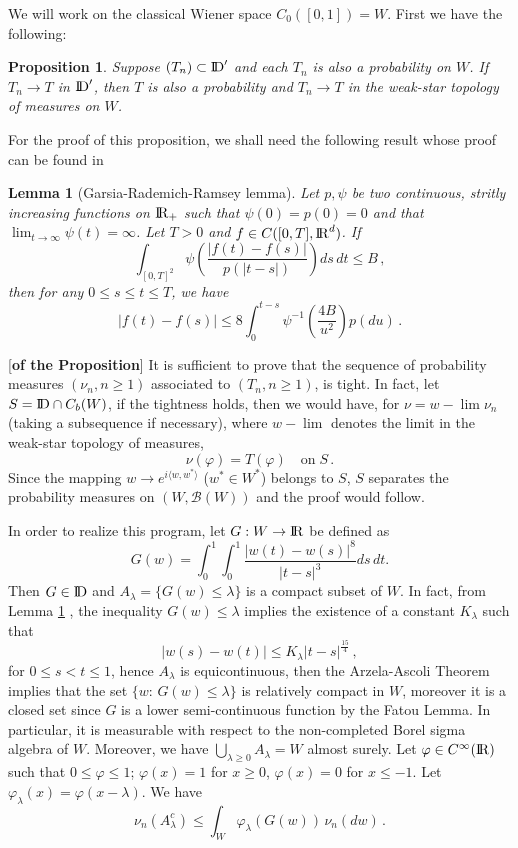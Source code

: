 \documentclass[12pt,a4paper]{book}
\newtheorem{lemma}[theorem]{Lemma}
\newtheorem{proposition}[theorem]{Proposition}
\newcommand{\la}{\lambda}
\newcommand{\B}{{\mathcal B}}
\newcommand{\DD}{{\rm I\!D}}
\newcommand{\R}{{\rm I\!R}}
\newcommand{\proof}{\noindent {\bf Proof:\ }}
\begin{document}
We will work on the classical Wiener space $C_0([0,1])=W$. First we have the
following:

\begin{proposition}
\label{basic-prop}
Suppose $(T_n)\subset \DD'$ and each $T_n$ is also a probability on $W$. If
$T_n\to T$ in $ \DD'$, then $T$ is also a probability and $T_n\to T$
in the weak-star  topology of measures on $W$.
\end{proposition}

\noindent
For the proof of this proposition, we shall need the following result
whose proof can be found in \cite{S-V}
\begin{lemma}[Garsia-Rademich-Ramsey lemma]
\label{lemma-GRR}
Let $p,\psi$ be two continuous, stritly increasing functions on $\R_+$
such that $\psi(0)=p(0)=0$ and that
$\lim_{t\to\infty}\psi(t)=\infty$. Let $T>0$ and $f\in
C([0,T],\R^d)$. If
$$
\int_{[0,T]^2}\psi\left(\frac{|f(t)-f(s)|}{p(|t-s|)}\right)ds \,dt\leq
B\,,
$$
then for any $0\leq s\leq t\leq T$, we have 
$$
|f(t)-f(s)|\leq
8\int_0^{t-s}\psi^{-1}\left(\frac{4B}{u^2}\right)p(du)\,.
$$
\end{lemma}
\proof[{\bf{of the Proposition}}]
It is sufficient to prove that the sequence  of  probability measures
$(\nu_n, n\geq 1)$
associated to $(T_n,n\geq 1)$, is tight. In fact, let $S= \DD \cap C_b(W)$,
if the tightness holds, then we would  have, for $\nu=w-\lim \nu_n$
(taking a subsequence if necessary),
where $w-\lim$ denotes the limit in the weak-star topology of measures, 
$$
\nu(\varphi)=T(\varphi)\quad {\mbox{on}}\; S\,.
$$
Since the mapping  $w\to e^{i\langle w,w^\ast\rangle}$ ($w^\ast\in
W^\ast$) belongs to $S$, $S$ separates the probability measures on
$(W,\B(W))$  and the proof would follow.

In order to realize this program, let $G:W\to \R$ be defined as
$$
G(w)=\int_0^1\!\!\int_0^1
\frac{|w(t)-w(s)|^8}{|t-s|^3}ds\,dt.
$$
Then  $G\in \DD$ and
$A_{\lambda}=\{G(w)\leq\lambda\}$ is a compact
subset of $W$. In fact, from  Lemma \ref{lemma-GRR} , the
inequality $G(w)\leq \la$ implies the existence of a constant
$K_\la$ such that  
$$
|w(s)-w(t)|\leq K_\la |t-s|^{\frac{15}{4}}\,,
$$
for $0\leq s<t\leq 1$, hence $A_\la$ is equicontinuous, then the
Arzela-Ascoli Theorem implies that the set $\{w:\,G(w)\leq \la\}$ is
relatively compact in $W$, moreover it is a  closed set  since $G$ 
is a lower semi-continuous function by the Fatou Lemma. In particular,
it is measurable with respect to the non-completed Borel sigma algebra
of $W$.
Moreover, we have $\bigcup_{\lambda\geq0}A_\lambda=W$ almost surely. Let
$\varphi\in C^\infty(\R)$ such that  $0\leq\varphi\leq1$; $\varphi(x)=1$ for
$x\geq0$, $\varphi(x)=0$ for $x\leq-1$. Let
$\varphi_\lambda(x)=\varphi(x-\lambda)$.
We have
$$
\nu_n(A_\lambda^c)\leq\int_W\varphi_\lambda(G(w))\,\nu_n(dw)\,.
$$
\end{document}
